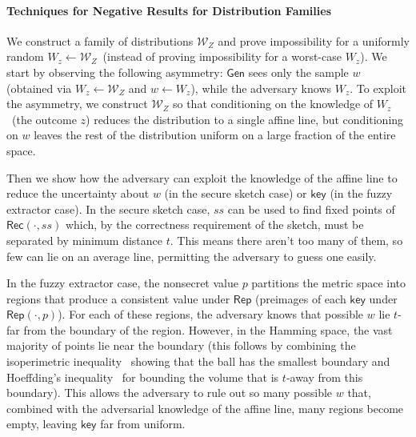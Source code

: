 \documentclass[11pt]{article}
\newcommand{\class}[1]{{\ensuremath{\mathsf{#1}}}}
\newcommand{\key}{\ensuremath{\class{key}}\xspace}
\newcommand{\gen}{\ensuremath{\class{Gen}}\xspace}
\newcommand{\rep}{\ensuremath{\class{Rep}}\xspace}
\newcommand{\rec}{\ensuremath{\class{Rec}}\xspace}
\begin{document}
\paragraph{Techniques for Negative Results for Distribution Families}
We construct a family of distributions $\mathcal{W}_Z$ and prove impossibility for a uniformly random $W_z \leftarrow \mathcal{W}_Z$~(instead of proving impossibility for a worst-case $W_z$).
We start by observing the following asymmetry: $\gen$  sees only the sample $w$ (obtained via $W_z\leftarrow \mathcal{W}_Z$ and $w\leftarrow W_z$), while
the adversary knows $W_z$.   To exploit the asymmetry, we construct $\mathcal{W}_Z$ so that conditioning on the knowledge of $W_z$~(the outcome $z$) reduces the distribution to a single affine line, but conditioning on $w$ leaves the rest of the distribution uniform on a large fraction of the entire space.

Then we show how the adversary can exploit the knowledge of the affine line to reduce the uncertainty about $w$ (in the secure sketch case) or $\key$ (in the fuzzy extractor case). 
In the secure sketch case, $ss$ can be used to find fixed points of $\rec(\cdot, ss)$ which, by the correctness requirement of the sketch, must be separated by minimum distance $t$. This means there aren't too many of them, so few can lie on an average line, permitting the adversary to guess one easily.

In the fuzzy extractor case, the nonsecret value $p$ partitions the metric space into regions that produce a consistent value under $\rep$ (preimages of each $\key$ under $\rep(\cdot, p)$).  For each of these regions, the adversary knows that possible $w$ lie $t$-far from the boundary of the region.  However, in the Hamming space, the vast majority of points lie near the boundary (this follows by combining the isoperimetric inequality~\cite{harper1966optimal} showing that the ball has the smallest boundary and Hoeffding's inequality~\cite{hoeffding1963probability} for bounding the volume that is $t$-away from this boundary).  This allows the adversary to rule out so many possible $w$ that, combined with the adversarial knowledge of the affine line, many regions become empty, leaving $\key$ far from uniform.
\end{document}

